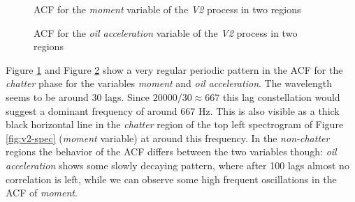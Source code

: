 \documentclass[12 pt]{scrartcl}
\begin{document}
\begin{figure}[p]
  \caption{ACF for the \emph{moment} variable of the \emph{V2} process in two regions}
  \label{fig:v2-moment-acfs}
\end{figure}


\begin{figure}[p]
  \caption{ACF for the \emph{oil acceleration} variable of the \emph{V2} process in two regions}
  \label{fig:v2-oil-acfs}
\end{figure}


Figure \ref{fig:v2-moment-acfs} and Figure \ref{fig:v2-oil-acfs} show a very regular periodic pattern in the ACF for the \emph{chatter} phase for the variables \emph{moment} and \emph{oil acceleration}. The wavelength seems to be around 30 lags. Since $20000/30 \approx 667$ this lag constellation would suggest a dominant frequency of around 667 Hz. This is also visible as a thick black horizontal line in the \emph{chatter} region of the top left spectrogram of Figure \ref{fig:v2-spec} (\emph{moment} variable) at around this frequency.
In the \emph{non-chatter} regions the behavior of the ACF differs between the two variables though: \emph{oil acceleration} shows some slowly decaying pattern, where after 100 lags almost no correlation is left, while we can observe some high frequent oscillations in the ACF of \emph{moment}.
\end{document}
